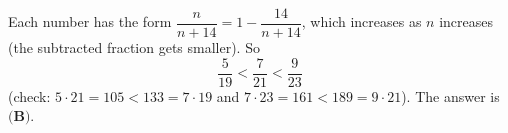 Each number has the form $\dfrac{n}{n+14}=1-\dfrac{14}{n+14}$, which increases as $n$ increases (the subtracted fraction gets smaller). So
\[\dfrac{5}{19}<\dfrac{7}{21}<\dfrac{9}{23}\]
(check: $5\cdot21=105<133=7\cdot19$ and $7\cdot23=161<189=9\cdot21$). The answer is $\boxed{\textbf{(B)}}$.
